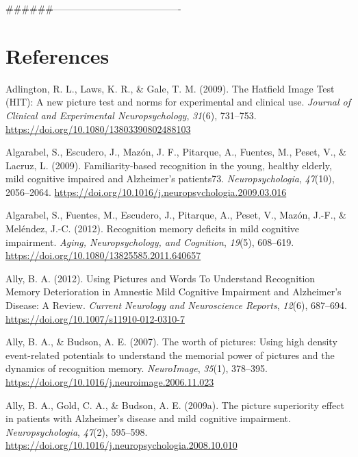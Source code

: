 \documentclass[
  11pt,
]{article}
\begin{document}
\newpage

\#\#\#\#\#\#----------------------------------------

\newpage

\hypertarget{references}{%
\section{References}\label{references}}

\setlength{\parindent}{-0.2in}
\setlength{\leftskip}{0.2in}
\setlength{\parskip}{8pt}

\noindent

\hypertarget{refs}{}
\leavevmode\hypertarget{ref-adlington2009}{}%
Adlington, R. L., Laws, K. R., \& Gale, T. M. (2009). The Hatfield Image
Test (HIT): A new picture test and norms for experimental and clinical
use. \emph{Journal of Clinical and Experimental Neuropsychology},
\emph{31}(6), 731--753. \url{https://doi.org/10.1080/13803390802488103}

\leavevmode\hypertarget{ref-algarabel2009}{}%
Algarabel, S., Escudero, J., Mazón, J. F., Pitarque, A., Fuentes, M.,
Peset, V., \& Lacruz, L. (2009). Familiarity-based recognition in the
young, healthy elderly, mild cognitive impaired and Alzheimer's
patients73. \emph{Neuropsychologia}, \emph{47}(10), 2056--2064.
\url{https://doi.org/10.1016/j.neuropsychologia.2009.03.016}

\leavevmode\hypertarget{ref-algarabel2012}{}%
Algarabel, S., Fuentes, M., Escudero, J., Pitarque, A., Peset, V.,
Mazón, J.-F., \& Meléndez, J.-C. (2012). Recognition memory deficits in
mild cognitive impairment. \emph{Aging, Neuropsychology, and Cognition},
\emph{19}(5), 608--619.
\url{https://doi.org/10.1080/13825585.2011.640657}

\leavevmode\hypertarget{ref-ally2012}{}%
Ally, B. A. (2012). Using Pictures and Words To Understand Recognition
Memory Deterioration in Amnestic Mild Cognitive Impairment and
Alzheimer's Disease: A Review. \emph{Current Neurology and Neuroscience
Reports}, \emph{12}(6), 687--694.
\url{https://doi.org/10.1007/s11910-012-0310-7}

\leavevmode\hypertarget{ref-ally2007}{}%
Ally, B. A., \& Budson, A. E. (2007). The worth of pictures: Using high
density event-related potentials to understand the memorial power of
pictures and the dynamics of recognition memory. \emph{NeuroImage},
\emph{35}(1), 378--395.
\url{https://doi.org/10.1016/j.neuroimage.2006.11.023}

\leavevmode\hypertarget{ref-ally2009}{}%
Ally, B. A., Gold, C. A., \& Budson, A. E. (2009a). The picture
superiority effect in patients with Alzheimer's disease and mild
cognitive impairment. \emph{Neuropsychologia}, \emph{47}(2), 595--598.
\url{https://doi.org/10.1016/j.neuropsychologia.2008.10.010}
\end{document}
